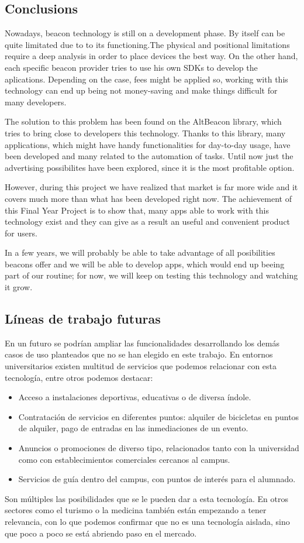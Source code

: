 \subsection{Conclusions}

Nowadays, beacon technology is still on a development phase. By itself can be quite limitated due to to its functioning.The physical and positional limitations require a deep analysis in order to place devices the best way. On the other hand, each specific beacon provider tries to use his own SDKs to develop the aplications. Depending on the case, fees might be applied so, working with this technology can end up being not money-saving and make things difficult for many developers.


The solution to this problem has been found on the AltBeacon library, which tries to bring close to developers this technology. Thanks to this library, many applications, which might have handy functionalities for day-to-day usage, have been developed and many related to the automation of tasks. Until now just the advertising possibilites have been explored, since it is the most profitable option. 


However, during this project we have realized that market is far more wide and it covers much more than what has been developed right now. The achievement of this Final Year Project is to show that, many apps able to work with this technology exist and they can give as a result an useful and convenient product for users. 


In a few years, we will probably be able to take advantage of all posibilities beacons offer and we will be able to develop apps, which would end up beeing part of our routine; for now, we will keep on testing this technology and watching it grow.

\subsection{Líneas de trabajo futuras}


En un futuro se podrían ampliar las funcionalidades desarrollando los demás casos de uso planteados que no se han elegido en este trabajo. En entornos universitarios existen multitud de servicios que podemos relacionar con esta tecnología, entre otros podemos destacar: 


\begin{itemize}
\item Acceso a instalaciones deportivas, educativas o de diversa índole.
\item Contratación de servicios en diferentes puntos: alquiler de bicicletas en puntos de alquiler, pago de entradas en las inmediaciones de un evento.
\item Anuncios o promociones de diverso tipo, relacionados tanto con la universidad como con establecimientos comerciales cercanos al campus.
\item Servicios de guía dentro del campus, con puntos de interés para el alumnado.
\end{itemize}


Son múltiples las posibilidades que se le pueden dar a esta tecnología. En otros sectores como el turismo o la medicina también están empezando a tener relevancia, con lo que podemos confirmar que no es una tecnología aislada, sino que poco a poco se está abriendo paso en el mercado.









